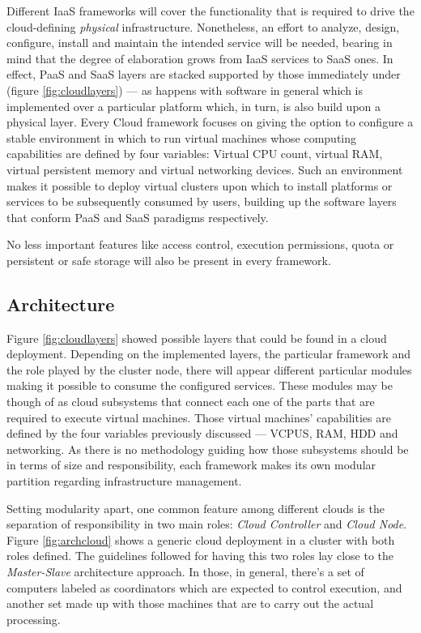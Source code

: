 Different IaaS frameworks will cover the functionality that is required to drive the cloud-defining \emph{physical} infrastructure. Nonetheless, an effort to analyze, design, configure, install and maintain the intended service will be needed, bearing in mind that the degree of elaboration grows from IaaS services to SaaS ones. In effect, PaaS and SaaS layers are stacked supported by those immediately under (figure \ref{fig:cloudlayers}) --- as happens with software in general which is implemented over a particular platform which, in turn, is also build upon a physical layer. Every Cloud framework focuses on giving the option to configure a stable environment in which to run virtual machines whose computing capabilities are defined by four variables: Virtual CPU count, virtual RAM, virtual persistent memory and virtual networking devices. Such an environment makes it possible to deploy virtual clusters upon which to install platforms or services to be subsequently consumed by users, building up the software layers that conform PaaS and SaaS paradigms respectively.

No less important features like access control, execution permissions, quota or persistent or safe storage will also be present in every framework.

\subsection{Architecture}\label{subsec:arquitecturacloud}
\noindent Figure \ref{fig:cloudlayers} showed possible layers that could be found in a cloud deployment. Depending on the implemented layers, the particular framework and the role played by the cluster node, there will appear different particular modules making it possible to consume the configured services. These modules may be though of as cloud subsystems that connect each one of the parts that are required to execute virtual machines. Those virtual machines' capabilities are defined by the four variables previously discussed --- VCPUS, RAM, HDD and networking. As there is no methodology guiding how those subsystems should be in terms of size and responsibility, each framework makes its own modular partition regarding infrastructure management.

Setting modularity apart, one common feature among different clouds is the separation of responsibility in two main roles: \emph{Cloud Controller} and \emph{Cloud Node}. Figure \ref{fig:archcloud} shows a generic cloud deployment in a cluster with both roles defined. The guidelines followed for having this two roles lay close to the \emph{Master-Slave} architecture approach. In those, in general, there's a set of computers labeled as coordinators which are expected to control execution, and another set made up with those machines that are to carry out the actual processing.

